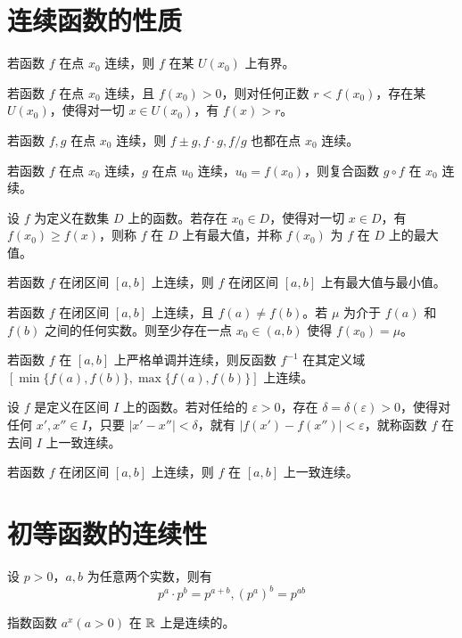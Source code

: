 \section{连续函数的性质}

\begin{theorem}[局部有界性]
	若函数 $f$ 在点 $x_0$ 连续，则 $f$ 在某 $U(x_0)$ 上有界。
\end{theorem}

\begin{theorem}[局部保号性]
	若函数 $f$ 在点 $x_0$ 连续，且 $f(x_0)>0$，则对任何正数 $r<f(x_0)$，存在某 $U(x_0)$，使得对一切 $x\in U(x_0)$，有 $f(x)>r$。
\end{theorem}

\begin{theorem}[四则运算]
	若函数 $f,g$ 在点 $x_0$ 连续，则 $f\pm g,f\cdot g,f/g$ 也都在点 $x_0$ 连续。
\end{theorem}

\begin{theorem}
	若函数 $f$ 在点 $x_0$ 连续，$g$ 在点 $u_0$ 连续，$u_0=f(x_0)$，则复合函数 $g\circ f$ 在 $x_0$ 连续。
\end{theorem}

\begin{definition}
	设 $f$ 为定义在数集 $D$ 上的函数。若存在 $x_0\in D$，使得对一切 $x\in D$，有 $f(x_0)\ge f(x)$，则称 $f$ 在 $D$ 上有最大值，并称 $f(x_0)$ 为 $f$ 在 $D$ 上的最大值。
\end{definition}

\begin{theorem}[最大、最小值定理]
	若函数 $f$ 在闭区间 $[a,b]$ 上连续，则 $f$ 在闭区间 $[a,b]$ 上有最大值与最小值。
\end{theorem}

\begin{theorem}[介值定理]
	若函数 $f$ 在闭区间 $[a,b]$ 上连续，且 $f(a)\ne f(b)$。若 $\mu$ 为介于 $f(a)$ 和 $f(b)$ 之间的任何实数。则至少存在一点 $x_0\in (a,b)$ 使得 $f(x_0)=\mu$。
\end{theorem}

\begin{theorem}
	若函数 $f$ 在 $[a,b]$ 上严格单调并连续，则反函数 $f^{-1}$ 在其定义域 $[\min\{f(a),f(b)\},\max\{f(a),f(b)\}]$ 上连续。
\end{theorem}

\begin{definition}
	设 $f$ 是定义在区间 $I$ 上的函数。若对任给的 $\varepsilon>0$，存在 $\delta=\delta(\varepsilon)>0$，使得对任何 $x',x''\in I$，只要 $|x'-x''|<\delta$，就有 $|f(x')-f(x'')|<\varepsilon$，就称函数 $f$ 在去间 $I$ 上一致连续。
\end{definition}

\begin{theorem}[一致连续性]
	若函数 $f$ 在闭区间 $[a,b]$ 上连续，则 $f$ 在 $[a,b]$ 上一致连续。
\end{theorem}

\section{初等函数的连续性}

\begin{theorem}
	设 $p>0$，$a,b$ 为任意两个实数，则有
	$$p^a\cdot p^b = p^{a+b},(p^a)^b=p^{ab}$$
\end{theorem}

\begin{theorem}
	指数函数 $a^x(a>0)$ 在 $\mathbb{R}$ 上是连续的。
\end{theorem}
